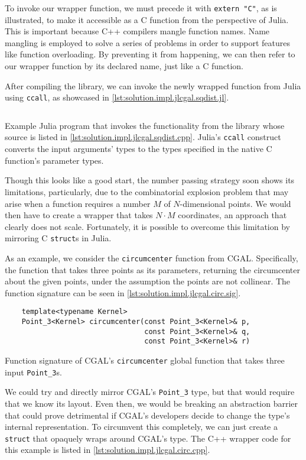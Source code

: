 To invoke our wrapper function, we must precede it with \texttt{extern
"C"}, as is illustrated, to make it accessible as a C function from the
perspective of Julia.  This is important because C++ compilers mangle function
names.  Name mangling is employed to solve a series of problems in order to
support features like function overloading. By preventing it from happening, we
can then refer to our wrapper function by its declared name, just like a C
function.

After compiling the library, we can invoke the newly wrapped function from Julia
using \texttt{ccall}, as showcased in
\cref{lst:solution.impl.jlcgal.sqdist.jl}.

\begin{listing}[htb]
  \inputminted{julia}{jl/sqdist.jl}
  \caption[Julia squared distance example program]{
    Example Julia program that invokes the functionality from the library whose
    source is listed in \cref{lst:solution.impl.jlcgal.sqdist.cpp}.  Julia's
    \texttt{ccall} construct converts the input arguments' types to
    the types specified in the native C function's parameter types.}%
  \label{lst:solution.impl.jlcgal.sqdist.jl}
\end{listing}

Though this looks like a good start, the number passing strategy soon shows its
limitations, particularly, due to the combinatorial explosion problem that may
arise when a function requires a number $M$ of $N$-dimensional points.  We would
then have to create a wrapper that takes $N\cdot M$ coordinates,  an approach
that clearly does not scale.  Fortunately, it is possible to overcome this
limitation by mirroring C \texttt{struct}s in Julia.

As an example, we consider the \texttt{circumcenter} function from \ac{CGAL}.
Specifically, the function that takes three points as its parameters, returning
the circumcenter about the given points, under the assumption the points are not
collinear.  The function signature can be seen in
\cref{lst:solution.impl.jlcgal.circ.sig}.  
\begin{listing}
  \begin{verbatim}
    template<typename Kernel> 
    Point_3<Kernel> circumcenter(const Point_3<Kernel>& p,
                                 const Point_3<Kernel>& q,
                                 const Point_3<Kernel>& r)
  \end{verbatim}
  \caption[\texttt{circumcenter} function signature]{
    Function signature of \ac{CGAL}'s \texttt{circumcenter} global function that
    takes three input \texttt{Point\_3}s.}%
  \label{lst:solution.impl.jlcgal.circ.sig}
\end{listing}
We could try and directly mirror
\ac{CGAL}'s \texttt{Point\_3} type, but that would require that we know its
layout.  Even then, we would be breaking an abstraction barrier that could prove
detrimental if \ac{CGAL}'s developers decide to change the type's internal
representation.  To circumvent this completely, we can just create a
\texttt{struct} that opaquely wraps around \ac{CGAL}'s type.  The C++
wrapper code for this example is listed in
\cref{lst:solution.impl.jlcgal.circ.cpp}.

